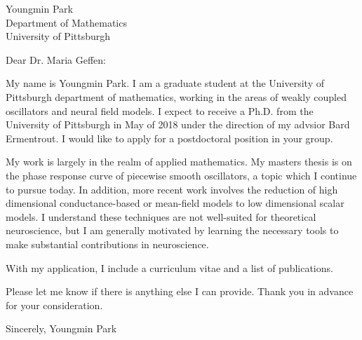 \documentclass[a4paper,11pt]{letter}
\begin{document}
\begin{letter}{Youngmin Park \\ Department of Mathematics\\ University of Pittsburgh}
 

\opening{Dear Dr. Maria Geffen:}

My name is Youngmin Park. I am a graduate student at the University of Pittsburgh department of mathematics, working in the areas of weakly coupled oscillators and neural field models. I expect to receive a Ph.D. from the University of Pittsburgh in May of 2018 under the direction of my advsior Bard Ermentrout. I would like to apply for a postdoctoral position in your group.
 
My work is largely in the realm of applied mathematics. My masters thesis is on the phase response curve of piecewise smooth oscillators, a topic which I continue to pursue today. In addition, more recent work involves the reduction of high dimensional conductance-based or mean-field models to low dimensional scalar models. I understand these techniques are not well-suited for theoretical neuroscience, but I am generally motivated by learning the necessary tools to make substantial contributions in neuroscience.

With my application, I include a curriculum vitae and a list of publications.

Please let me know if there is anything else I can provide. Thank you in advance for your consideration.

Sincerely,
Youngmin Park
 
 
 
\end{letter}
\end{document}
